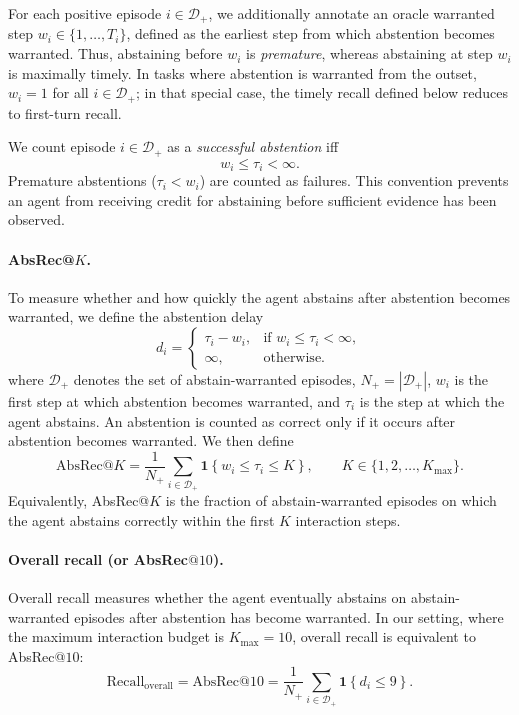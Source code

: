 \documentclass{llmxive}
\providecommand{\ind}[1]{\mathbf{1}\!\left\{#1\right\}}
\begin{document}
For each positive episode $i\in\mathcal{D}_{+}$, we additionally annotate an oracle warranted step $w_i\in\{1,\ldots,T_i\}$, defined as the earliest step from which abstention becomes warranted. Thus, abstaining before $w_i$ is \emph{premature}, whereas abstaining at step $w_i$ is maximally timely. In tasks where abstention is warranted from the outset, $w_i=1$ for all $i\in\mathcal{D}_{+}$; in that special case, the timely recall defined below reduces to first-turn recall.

We count episode $i\in\mathcal{D}_{+}$ as a \emph{successful abstention} iff
\begin{equation}
w_i \le \tau_i < \infty.
\label{eq:success_condition}
\end{equation}
Premature abstentions ($\tau_i < w_i$) are counted as failures. This convention prevents an agent from receiving credit for abstaining before sufficient evidence has been observed.

\paragraph{AbsRec@\texorpdfstring{$K$}{K}.}
To measure whether and how quickly the agent abstains after abstention becomes warranted, we define the abstention delay
\begin{equation}
d_i =
\begin{cases}
\tau_i - w_i, & \text{if } w_i \le \tau_i < \infty,\\
\infty, & \text{otherwise}.
\end{cases}
\label{eq:delay}
\end{equation}
where $\mathcal{D}_{+}$ denotes the set of abstain-warranted episodes, $N_{+}=|\mathcal{D}_{+}|$, $w_i$ is the first step at which abstention becomes warranted, and $\tau_i$ is the step at which the agent abstains. An abstention is counted as correct only if it occurs after abstention becomes warranted. We then define
\begin{equation}
\mathrm{AbsRec}@K
=
\frac{1}{N_{+}}
\sum_{i \in \mathcal{D}_{+}}
\ind{w_i \le \tau_i \le K},
\qquad
K \in \{1,2,\ldots,K_{\max}\}.
\label{eq:absrec_at_k}
\end{equation}
Equivalently, AbsRec@$K$ is the fraction of abstain-warranted episodes on which the agent abstains correctly within the first $K$ interaction steps.

\paragraph{Overall recall (or AbsRec\texorpdfstring{$@10$}{@10}).}
Overall recall measures whether the agent eventually abstains on abstain-warranted episodes after abstention has become warranted. In our setting, where the maximum interaction budget is $K_{\max}=10$, overall recall is equivalent to AbsRec@$10$:
\begin{equation}
\mathrm{Recall}_{\mathrm{overall}}
=
\mathrm{AbsRec}@10
=
\frac{1}{N_{+}}
\sum_{i \in \mathcal{D}_{+}}
\ind{d_i \le 9}.
\label{eq:recall_overall}
\end{equation}
\end{document}

